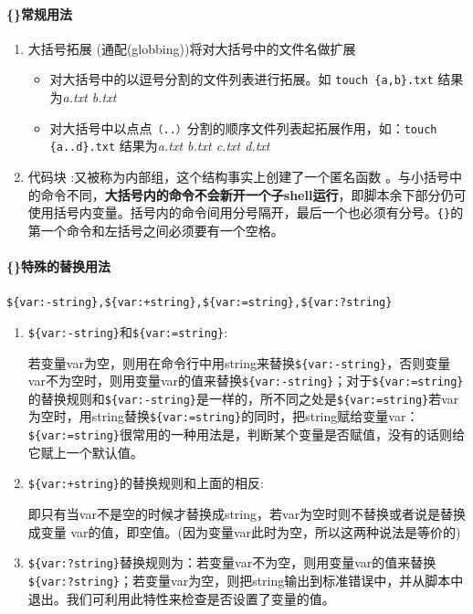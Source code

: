 \documentclass[UTF8,a4paper,12pt]{ctexbook}
\begin{document}
				\paragraph{\{\}常规用法}
				\begin{enumerate}
					\item 大括号拓展 (通配(globbing))将对大括号中的文件名做扩展
						\begin{itemize}
							\item 对大括号中的以逗号分割的文件列表进行拓展。如 \verb|touch {a,b}.txt| 结果为\textit{a.txt b.txt}
							\item 对大括号中以点点\verb|（..）|分割的顺序文件列表起拓展作用，如：\verb|touch {a..d}.txt| 结果为\textit{a.txt b.txt c.txt d.txt}
						\end{itemize}
					\item 代码块 :又被称为内部组，这个结构事实上创建了一个匿名函数 。与小括号中的命令不同，\textbf{大括号内的命令不会新开一个子shell运行}，即脚本余下部分仍可使用括号内变量。括号内的命令间用分号隔开，最后一个也必须有分号。\verb|{}|的第一个命令和左括号之间必须要有一个空格。
				\end{enumerate}
				
				\paragraph{\{\}特殊的替换用法} \verb|${var:-string},${var:+string},${var:=string},${var:?string}|
				\begin{enumerate}
					\item \verb|${var:-string}|和\verb|${var:=string}|:
					
					若变量var为空，则用在命令行中用string来替换\verb|${var:-string}|，否则变量var不为空时，则用变量var的值来替换\verb|${var:-string}|；对于\verb|${var:=string}|的替换规则和\verb|${var:-string}|是一样的，所不同之处是\verb|${var:=string}|若var为空时，用string替换\verb|${var:=string}|的同时，把string赋给变量var：\verb| ${var:=string}|很常用的一种用法是，判断某个变量是否赋值，没有的话则给它赋上一个默认值。
					
					\item \verb|${var:+string}|的替换规则和上面的相反:
					
					即只有当var不是空的时候才替换成string，若var为空时则不替换或者说是替换成变量 var的值，即空值。(因为变量var此时为空，所以这两种说法是等价的) 
					
					\item \verb|${var:?string}|替换规则为：若变量var不为空，则用变量var的值来替换\verb|${var:?string}|；若变量var为空，则把string输出到标准错误中，并从脚本中退出。我们可利用此特性来检查是否设置了变量的值。
				\end{enumerate}
\end{document}
